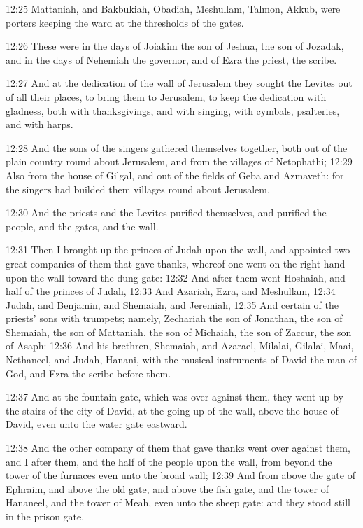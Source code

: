 12:25 Mattaniah, and Bakbukiah, Obadiah, Meshullam, Talmon, Akkub,
were porters keeping the ward at the thresholds of the gates.

12:26 These were in the days of Joiakim the son of Jeshua, the son of
Jozadak, and in the days of Nehemiah the governor, and of Ezra the
priest, the scribe.

12:27 And at the dedication of the wall of Jerusalem they sought the
Levites out of all their places, to bring them to Jerusalem, to keep
the dedication with gladness, both with thanksgivings, and with
singing, with cymbals, psalteries, and with harps.

12:28 And the sons of the singers gathered themselves together, both
out of the plain country round about Jerusalem, and from the villages
of Netophathi; 12:29 Also from the house of Gilgal, and out of the
fields of Geba and Azmaveth: for the singers had builded them villages
round about Jerusalem.

12:30 And the priests and the Levites purified themselves, and
purified the people, and the gates, and the wall.

12:31 Then I brought up the princes of Judah upon the wall, and
appointed two great companies of them that gave thanks, whereof one
went on the right hand upon the wall toward the dung gate: 12:32 And
after them went Hoshaiah, and half of the princes of Judah, 12:33 And
Azariah, Ezra, and Meshullam, 12:34 Judah, and Benjamin, and Shemaiah,
and Jeremiah, 12:35 And certain of the priests' sons with trumpets;
namely, Zechariah the son of Jonathan, the son of Shemaiah, the son of
Mattaniah, the son of Michaiah, the son of Zaccur, the son of Asaph:
12:36 And his brethren, Shemaiah, and Azarael, Milalai, Gilalai, Maai,
Nethaneel, and Judah, Hanani, with the musical instruments of David
the man of God, and Ezra the scribe before them.

12:37 And at the fountain gate, which was over against them, they went
up by the stairs of the city of David, at the going up of the wall,
above the house of David, even unto the water gate eastward.

12:38 And the other company of them that gave thanks went over against
them, and I after them, and the half of the people upon the wall, from
beyond the tower of the furnaces even unto the broad wall; 12:39 And
from above the gate of Ephraim, and above the old gate, and above the
fish gate, and the tower of Hananeel, and the tower of Meah, even unto
the sheep gate: and they stood still in the prison gate.

